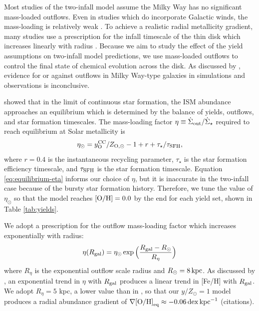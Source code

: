 \documentclass[twocolumn,twocolappendix,linenumbers]{aastex631}
\newcommand{\mathOH}{{\rm [O/H]}}
\newcommand{\todo}[1]{{\color{red}#1}}
\begin{document}
Most studies of the two-infall model assume the Milky Way has no significant mass-loaded outflows. Even in studies which do incorporate Galactic winds, the mass-loading is relatively weak \citep[e.g., $\eta\approx0.2$ in][]{palicio_analytic_2023}. To achieve a realistic radial metallicity gradient, many studies use a prescription for the infall timescale of the thin disk which increases linearly with radius \citep[e.g.,][]{chiappini_chemical_1997,romano_mass_2000}. Because we aim to study the effect of the yield assumptions on two-infall model predictions, we use mass-loaded outflows to control the final state of chemical evolution across the disk. As discussed by \citet{johnson_milky_2024}, evidence for or against outflows in Milky Way-type galaxies in simulations and observations is inconclusive.

\citet{weinberg_equilibrium_2017} showed that in the limit of continuous star formation, the ISM abundance approaches an equilibrium which is determined by the balance of yields, outflows, and star formation timescales. The mass-loading factor $\eta\equiv \dot\Sigma_{\rm out}/\dot\Sigma_\star$ required to reach equilibrium at Solar metallicity is
\begin{equation}
    \label{eq:equilibrium-eta}
    \eta_\odot = y_{\rm O}^{\rm CC} / Z_{\rm O,\odot} - 1 + r + \tau_\star / \tau_{\rm SFH},
\end{equation}
where $r=0.4$ is the instantaneous recycling parameter, $\tau_\star$ is the star formation efficiency timescale, and $\tau_{\rm SFH}$ is the star formation timescale. Equation \ref{eq:equilibrium-eta} informs our choice of $\eta$, but it is inaccurate in the two-infall case because of the bursty star formation history. Therefore, we tune the value of $\eta_\odot$ so that the model reaches $\mathOH=0.0$ by the end for each yield set, shown in Table \ref{tab:yields}.

We adopt a prescription for the outflow mass-loading factor which increases exponentially with radius:
\begin{equation}
    \eta(R_{\rm gal}) = \eta_\odot \exp\Big(\frac{R_{\rm gal}-R_\odot}{R_\eta}\Big)
\end{equation}
where $R_\eta$ is the exponential outflow scale radius and $R_\odot=8\,{\rm kpc}$. As discussed by \citet{johnson_milky_2024}, an exponential trend in $\eta$ with $R_{\rm gal}$ produces a linear trend in [Fe/H] with $R_{\rm gal}$. We adopt $R_\eta=5$ kpc, a lower value than in \citet{johnson_milky_2024}, so that our $y/Z_\odot=1$ model produces a radial abundance gradient of $\nabla\mathOH_{\rm eq}\approx-0.06\,{\rm dex}\,{\rm kpc}^{-1}$ \todo{(citations)}.
\end{document}
